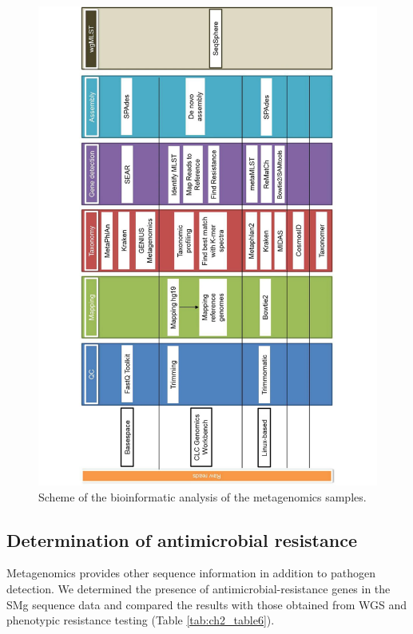 \begin{figure}[h!]
\centering
\includegraphics[angle=-90,width=\textwidth]{figures/chapter 2/41598_2018_31873_Fig1_HTML.pdf}
\caption{Scheme of the bioinformatic analysis of the metagenomics samples.}
\label{fig:chap2_figure1}
\end{figure}

\subsection{Determination of antimicrobial resistance}

Metagenomics provides other sequence information in addition to pathogen detection. 
We determined the presence of antimicrobial-resistance genes in the \ac{SMg} sequence data and compared the results with those obtained from \ac{WGS} and phenotypic resistance testing (Table \ref{tab:ch2_table6}).

